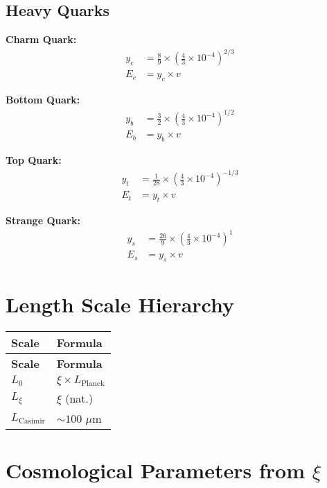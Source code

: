 \documentclass[12pt,a4paper]{article}
\begin{document}
	\subsection{Heavy Quarks}
	
	\textbf{Charm Quark:}
	\begin{align}
		y_c &= \frac{8}{9} \times \left(\frac{4}{3} \times 10^{-4}\right)^{2/3} \\
		E_c &= y_c \times v
	\end{align}
	
	\textbf{Bottom Quark:}
	\begin{align}
		y_b &= \frac{3}{2} \times \left(\frac{4}{3} \times 10^{-4}\right)^{1/2} \\
		E_b &= y_b \times v
	\end{align}
	
	\textbf{Top Quark:}
	\begin{align}
		y_t &= \frac{1}{28} \times \left(\frac{4}{3} \times 10^{-4}\right)^{-1/3} \\
		E_t &= y_t \times v
	\end{align}
	
	\textbf{Strange Quark:}
	\begin{align}
		y_s &= \frac{26}{9} \times \left(\frac{4}{3} \times 10^{-4}\right)^{1} \\
		E_s &= y_s \times v
	\end{align}
	
	\section{Length Scale Hierarchy}
	
	\begin{longtable}{|p{3cm}|p{4cm}|}
		\hline
		\textbf{Scale} & \textbf{Formula} \\
		\hline
		\endfirsthead
		\hline
		\textbf{Scale} & \textbf{Formula} \\
		\hline
		\endhead
		\(L_0\) & \(\xi \times L_{\text{Planck}}\) \\
		\hline
		\(L_{\xi}\) & \(\xi\) (nat.) \\
		\hline
		\(L_{\text{Casimir}}\) & \(\sim 100\) \(\mu\)m \\
		\hline
	\end{longtable}
	
	\section{Cosmological Parameters from \(\xi\)}
	
\end{document}
